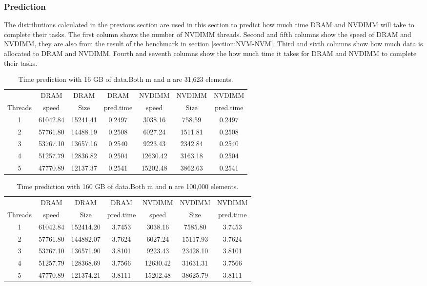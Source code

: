 \documentclass[12pt,a4paper,USenglish]{article}      %
\begin{document}
\subsubsection{Prediction}
The distributions calculated in the previous section are used in this section to predict how much time DRAM and NVDIMM will take to complete their tasks.
The first column shows the number of NVDIMM threads. Second and fifth columns show the speed of DRAM and NVDIMM, they are also from the result of the benchmark in section \ref{section:NVM-NVM}.
Third and sixth columns show how much data is allocated to DRAM and NVDIMM. Fourth and seventh columns show the how much time it takes for DRAM and NVDIMM to complete their tasks.

\begin{table}[!hbtp]
\centering
\begin{tabular}{ |c|c|c|c|c|c|c| }
\hline
        & DRAM  & DRAM & DRAM      & NVDIMM & NVDIMM & NVDIMM \\
Threads & speed & Size & pred.time & speed  & Size   & pred.time \\
\hline
1 & 61042.84 & 15241.41 & 0.2497 & 3038.16 & 758.59 & 0.2497 \\
\hline
2 & 57761.80 & 14488.19 & 0.2508 & 6027.24 & 1511.81 & 0.2508 \\
\hline
3 & 53767.10 & 13657.16 & 0.2540 & 9223.43 & 2342.84 & 0.2540 \\
\hline
4 & 51257.79 & 12836.82 & 0.2504 & 12630.42 & 3163.18 & 0.2504 \\
\hline
5 & 47770.89 & 12137.37 & 0.2541 & 15202.48 & 3862.63 & 0.2541 \\
\hline
\end{tabular}
\caption{Time prediction with 16 GB of data.Both m and n are 31,623 elements.}
\label{tab:Prediction16GB}
\end{table}

\begin{table}[!hbtp]
\centering
\begin{tabular}{ |c|c|c|c|c|c|c| }
\hline
        & DRAM  & DRAM & DRAM      & NVDIMM & NVDIMM & NVDIMM \\
Threads & speed & Size & pred.time & speed  & Size   & pred.time \\
\hline
1 & 61042.84 & 152414.20 & 3.7453 & 3038.16 & 7585.80 & 3.7453 \\
\hline
2 & 57761.80 & 144882.07 & 3.7624 & 6027.24 & 15117.93 & 3.7624 \\
\hline
3 & 53767.10 & 136571.90 & 3.8101 & 9223.43 & 23428.10 & 3.8101 \\
\hline
4 & 51257.79 & 128368.69 & 3.7566 & 12630.42 & 31631.31 & 3.7566 \\
\hline
5 & 47770.89 & 121374.21 & 3.8111 & 15202.48 & 38625.79 & 3.8111 \\
\hline
\end{tabular}
\caption{Time prediction with 160 GB of data.Both m and n are 100,000 elements.}
\label{tab:Prediction160GB}
\end{table}
\end{document}

